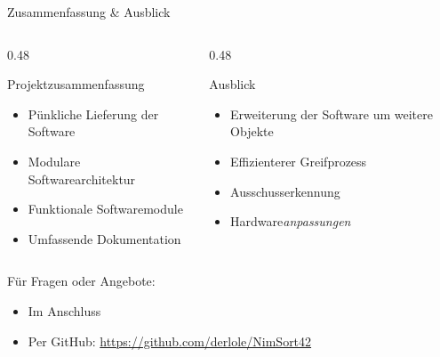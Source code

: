 \documentclass[aspectratio=169]{beamer}
\begin{document}
	\begin{frame}{Zusammenfassung \& Ausblick}

	\begin{columns}[T]

	\begin{column}{0.48\textwidth}
		\begin{block}{Projektzusammenfassung}
			\begin{itemize}
				\item Pünkliche Lieferung der Software
				\item Modulare Softwarearchitektur
				\item Funktionale Softwaremodule
				\item Umfassende Dokumentation
			\end{itemize}
		\end{block}
	\end{column}

	\begin{column}{0.48\textwidth}
		\begin{block}{Ausblick}
			\begin{itemize}
				\item Erweiterung der Software um weitere Objekte
				\item Effizienterer Greifprozess
				\item Ausschusserkennung
				\item Hardware\textit{anpassungen}
			\end{itemize}
		\end{block}
	\end{column}

	\end{columns}
	\begin{block}{Für Fragen oder Angebote:}
		\begin{itemize}
			\item Im Anschluss
			\item Per GitHub: \url{https://github.com/derlole/NimSort42}
		\end{itemize}
	\end{block}

	\end{frame}
	
\end{document}
